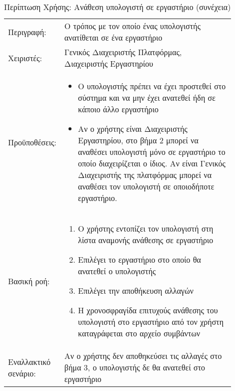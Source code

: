 %
%
\begin{longtable}{|p{0.14\linewidth}|p{0.76\linewidth}|}
	\caption{Περίπτωση Χρήσης: Ανάθεση υπολογιστή σε εργαστήριο} \label{tab:use-case-add-computer-to-lab} \\ \hline \endfirsthead
	\caption[{}]{Περίπτωση Χρήσης: Ανάθεση υπολογιστή σε εργαστήριο (συνέχεια)} \\ \endhead \endfoot
	Περιγραφή: & Ο τρόπος με τον οποίο ένας υπολογιστής ανατίθεται σε ένα εργαστήριο \\ \hline
	Χειριστές: & Γενικός Διαχειριστής Πλατφόρμας, Διαχειριστής Εργαστηρίου \\ \hline
	Προϋποθέσεις: &
	\begin{itemize}
		\vspace{-1cm}
		\addtolength{\itemindent}{-0.4cm}
		\item Ο υπολογιστής πρέπει να έχει προστεθεί στο σύστημα και να μην έχει ανατεθεί ήδη σε κάποιο άλλο εργαστήριο
		\item Αν ο χρήστης είναι Διαχειριστής Εργαστηρίου, στο βήμα 2 μπορεί να αναθέσει υπολογιστή μόνο σε εργαστήριο το οποίο διαχειρίζεται ο ίδιος. Αν είναι Γενικός Διαχειριστής της πλατφόρμας μπορεί να αναθέσει τον υπολογιστή σε οποιοδήποτε εργαστήριο.
		\vspace{-0.7cm}
	\end{itemize} \\ \hline
	Βασική ροή: &
	\begin{enumerate}
		\vspace{-1cm}
		\addtolength{\itemindent}{-0.4cm}
		\item Ο χρήστης εντοπίζει τον υπολογιστή στη λίστα αναμονής ανάθεσης σε εργαστήριο
		\item Επιλέγει το εργαστήριο στο οποίο θα ανατεθεί ο υπολογιστής
		\item Επιλέγει την αποθήκευση αλλαγών
		\item Η χρονοσφραγίδα επιτυχούς ανάθεσης του υπολογιστή στο εργαστήριο από τον χρήστη καταγράφεται στο αρχείο συμβάντων
		\vspace{-0.7cm}
	\end{enumerate} \\ \hline
	Εναλλακτικό σενάριο: & Αν ο χρήστης δεν αποθηκεύσει τις αλλαγές στο βήμα 3, ο υπολογιστής δε θα ανατεθεί στο εργαστήριο \\ \hline
\end{longtable}

